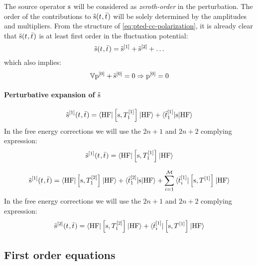 The source operator $\mathrm{s}$ will be considered as \emph{zeroth-order} in
the perturbation.
The order of the contributions to $\tilde{\mathrm{s}}(t_{},\bar{t}_{})$ will be
solely determined by the amplitudes and multipliers.
From the structure of \eqref{eq:pted-cc-polarization}, it is already
clear that $\tilde{\mathrm{s}}(t_{},\bar{t}_{})$ is at least first order in the
fluctuation potential:
\begin{equation}
  \tilde{\mathrm{s}}(t_{},\bar{t}_{}) =
  \tilde{\mathrm{s}}^{[1]}
  + \tilde{\mathrm{s}}^{[2]}
  + \ldots
\end{equation}
which also implies:
\begin{equation}
  \mathbb{V}\mathrm{p}^{[0]} + \tilde{\mathrm{s}}^{[0]} = 0 \Rightarrow  \mathrm{p}^{[0]} = 0
\end{equation}

\paragraph*{Perturbative expansion of $\tilde{\mathrm{s}}$}

\begin{equation}\label{eq:source-1st-order}
  \tilde{\mathrm{s}}^{[1]}(t_{}, \bar{t}_{}) =
  \braket{\mathrm{HF} | \left[ \mathrm{s}, T^{[1]}_1 \right]^{} | \mathrm{HF}}
  + \braket{\bar{t}_{1}^{[1]} | \mathrm{s} | \mathrm{HF}}
\end{equation}
In the free energy corrections we will use the $2n+1$ and $2n+2$ complying
expression:
\begin{equation}\label{eq:source-1st-order-rules}
  \tilde{\mathrm{s}}^{[1]}(t_{}, \bar{t}_{}) =
  \braket{\mathrm{HF} | \left[ \mathrm{s}, T^{[1]}_1 \right]^{} | \mathrm{HF}}
\end{equation}

\begin{equation}\label{eq:source-2nd-order}
  \tilde{\mathrm{s}}^{[1]}(t_{}, \bar{t}_{}) =
  \braket{\mathrm{HF} | \left[ \mathrm{s}, T^{[2]}_1 \right]^{} | \mathrm{HF}}
  + \braket{\bar{t}_{1}^{[2]} | \mathrm{s} | \mathrm{HF}}
  + \sum_{i=1}^{\mathcal{M}}\braket{\bar{t}_{i}^{[1]} | \left[ \mathrm{s}, T^{[1]} \right]^{} | \mathrm{HF}}
\end{equation}
In the free energy corrections we will use the $2n+1$ and $2n+2$ complying
expression:
\begin{equation}\label{eq:source-2nd-order-rules}
  \tilde{\mathrm{s}}^{[2]}(t_{}, \bar{t}_{}) =
  \braket{\mathrm{HF} | \left[ \mathrm{s}, T^{[2]}_1 \right]^{} | \mathrm{HF}}
  + \braket{\bar{t}_{i}^{[1]} | \left[ \mathrm{s}, T^{[1]} \right]^{} | \mathrm{HF}}
\end{equation}



\subsection{First order equations}\label{sec:first-order-pt}

